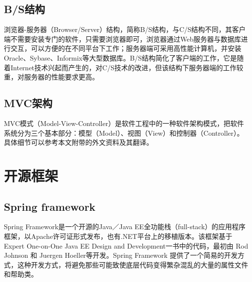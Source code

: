 \subsection{B/S结构}
浏览器-服务器（Browser/Server）结构，简称B/S结构，与C/S结构不同，其客户端不需要安装专门的软件，只需要浏览器即可，浏览器通过Web服务器与数据库进行交互，可以方便的在不同平台下工作；服务器端可采用高性能计算机，并安装Oracle、Sybase、Informix等大型数据库。B/S结构简化了客户端的工作，它是随着Internet技术兴起而产生的，对C/S技术的改进，但该结构下服务器端的工作较重，对服务器的性能要求更高。

\subsection{MVC架构}
MVC模式（Model-View-Controller）是软件工程中的一种软件架构模式，把软件系统分为三个基本部分：模型（Model）、视图（View）和控制器（Controller）。具体细节可以参考本文附带的外文资料\cite{MVCArchitecture}及其翻译。

\section{开源框架}
\subsection{Spring framework}
Spring Framework是一个开源的Java／Java EE全功能栈（full-stack）的应用程序框架，以Apache许可证形式发布，也有.NET平台上的移植版本。该框架基于 Expert One-on-One Java EE Design and Development\cite{johnson2004expert}一书中的代码，最初由 Rod Johnson 和 Juergen Hoeller等开发。Spring Framework 提供了一个简易的开发方式，这种开发方式，将避免那些可能致使底层代码变得繁杂混乱的大量的属性文件和帮助类。

